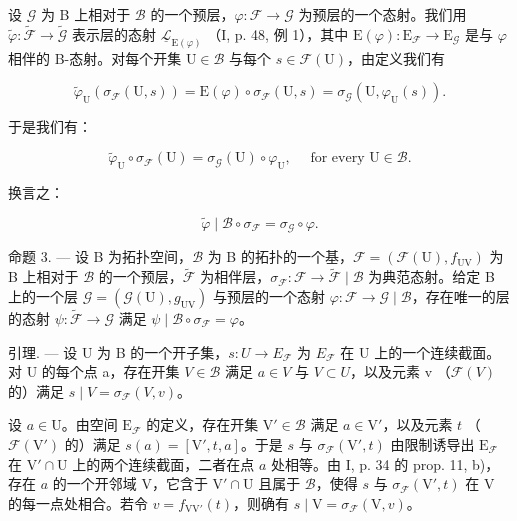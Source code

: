 设 \(\mathcal{G}\) 为 B 上相对于 \(\mathcal{B}\) 的一个预层，\(\varphi\colon\mathcal{F}\to\mathcal{G}\) 为预层的一个态射。我们用 \(\widetilde{\varphi}\colon\widetilde{\mathcal{F}}\to\widetilde{\mathcal{G}}\) 表示层的态射 \(\underline{\mathcal{L}}_{\mathrm{E}(\varphi)}\) （I, p. 48, 例 1），其中 \(\mathrm{E}(\varphi)\colon\mathrm{E}_{\mathcal{F}}\to\mathrm{E}_{\mathcal{G}}\) 是与 \(\varphi\) 相伴的 B-态射。对每个开集 \(\mathrm{U}\in\mathcal{B}\) 与每个 \(s\in\mathcal{F}(\mathrm{U})\)，由定义我们有

\[
\widetilde {\varphi} _ {\mathrm{U}} (\sigma_ {\mathcal {F}} (\mathrm{U}, s)) = \mathrm{E} (\varphi) \circ \sigma_ {\mathcal {F}} (\mathrm{U}, s) = \sigma_ {\mathcal {G}} (\mathrm{U}, \varphi_ {\mathrm{U}} (s)).
\]

于是我们有：

\[
\widetilde {\varphi} _ {\mathrm{U}} \circ \sigma_ {\mathcal {F}} (\mathrm{U}) = \sigma_ {\mathcal {G}} (\mathrm{U}) \circ \varphi_ {\mathrm{U}}, \quad \text {   for   every   } \mathrm{U} \in \mathcal {B}.\tag{1}
\]

换言之：

\[
\widetilde {\varphi} \mid \mathcal {B} \circ \sigma_ {\mathcal {F}} = \sigma_ {\mathcal {G}} \circ \varphi .\tag{2}
\]

命题 3. --- 设 B 为拓扑空间，\(\mathcal{B}\) 为 B 的拓扑的一个基，\(\mathcal{F} = (\mathcal{F}(\mathrm{U}), f_{\mathrm{UV}})\) 为 B 上相对于 \(\mathcal{B}\) 的一个预层，\(\widetilde{\mathcal{F}}\) 为相伴层，\(\sigma_{\mathcal{F}}: \mathcal{F} \to \widetilde{\mathcal{F}} \mid \mathcal{B}\) 为典范态射。给定 B 上的一个层 \(\mathcal{G} = (\mathcal{G}(\mathrm{U}), g_{\mathrm{UV}})\) 与预层的一个态射 \(\varphi: \mathcal{F} \to \mathcal{G} \mid \mathcal{B}\)，存在唯一的层的态射 \(\psi: \widetilde{\mathcal{F}} \to \mathcal{G}\) 满足 \(\psi \mid \mathcal{B} \circ \sigma_{\mathcal{F}} = \varphi\)。

引理. --- 设 U 为 B 的一个开子集，\(s\colon U \to E_{\mathcal{F}}\) 为 \(E_{\mathcal{F}}\) 在 U 上的一个连续截面。对 U 的每个点 a，存在开集 \(V \in \mathcal{B}\) 满足 \(a \in V\) 与 \(V \subset U\)，以及元素 v （\(\mathcal{F}(V)\) 的）满足 \(s \mid V = \sigma_{\mathcal{F}}(V, v)\)。

设 \(a \in \mathrm{U}\)。由空间 \(\mathrm{E}_{\mathcal{F}}\) 的定义，存在开集 \(\mathrm{V}' \in \mathcal{B}\) 满足 \(a \in \mathrm{V}'\)，以及元素 \(t\) （\(\mathcal{F}(\mathrm{V}')\) 的）满足 \(s(a) = [\mathrm{V}', t, a]\)。于是 \(s\) 与 \(\sigma_{\mathcal{F}}(\mathrm{V}', t)\) 由限制诱导出 \(\mathrm{E}_{\mathcal{F}}\) 在 \(\mathrm{V}' \cap \mathrm{U}\) 上的两个连续截面，二者在点 \(a\) 处相等。由 I, p. 34 的 prop. 11, b)，存在 \(a\) 的一个开邻域 V，它含于 \(\mathrm{V}' \cap \mathrm{U}\) 且属于 \(\mathcal{B}\)，使得 \(s\) 与 \(\sigma_{\mathcal{F}}(\mathrm{V}', t)\) 在 V 的每一点处相合。若令 \(v = f_{\mathrm{VV}'}(t)\)，则确有 \(s \mid \mathrm{V} = \sigma_{\mathcal{F}}(\mathrm{V}, v)\)。

